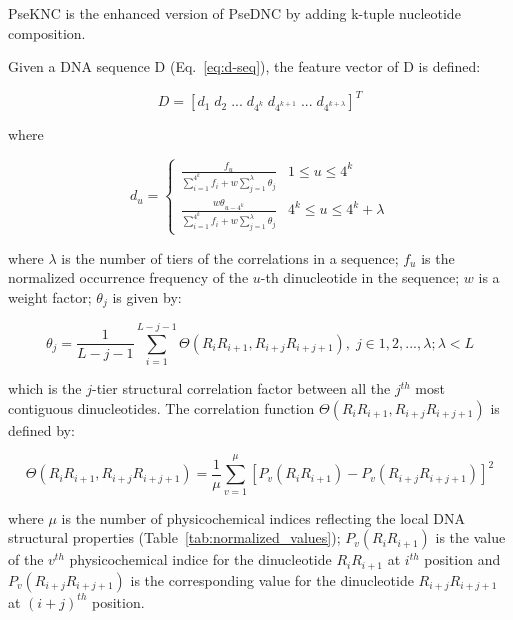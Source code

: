 
\gls{PseKNC} is the enhanced version of \gls{PseDNC} by adding k-tuple nucleotide composition.

Given a \gls{DNA} sequence D (Eq.~\ref{eq:d-seq}), the feature vector of D is defined:

\begin{equation}\label{eq:PseKNC-feature-vector}
    D = [d_{1}\;d_{2}\;...\;d_{4^{k}}\;d_{4^{k+1}}\;...\;d_{4^{k+ \lambda}}]^{T}
\end{equation}

\noindent where

\begin{equation}\label{eq:PseKNC-du}
    d_{u} = 
    \begin{cases}
        \frac{f_{u}}{\sum_{i=1}^{4^{k}} f_{i} + w\sum_{j=1}^{\lambda}\theta_{j}} & 1 \le u \le 4^{k}
    \\
        \frac{w\theta_{u-4^{k}}}{\sum_{i=1}^{4^{k}} f_{i} + w\sum_{j=1}^{\lambda}\theta_{j}} & 4^{k} \le u \le 4^{k} + \lambda
    
    \end{cases}
\end{equation}

\noindent where $\lambda$ is the number of tiers of the correlations in a sequence; $f_{u}$ is the normalized occurrence frequency of the $u$-th dinucleotide in the sequence; $w$ is a weight factor; $\theta_{j}$ is given by:

\begin{equation}\label{eq:PseKNC-thetas}
\theta_{j} = \frac{1}{L-j-1} \sum_{i=1}^{L-j-1}\Theta(R_{i}R_{i+1}, R_{i+j}R_{i+j+1}), \;j\in{1,2,...,\lambda;\lambda < L}
\end{equation}

\noindent which is the $j$-tier structural correlation factor between all the $j^{th}$ most
contiguous dinucleotides. The correlation function $\Theta(R_{i}R_{i+1}, R_{i+j}R_{i+j+1})$ is defined by:

\begin{equation}\label{eq:PseKNC-correlation}
    \Theta(R_{i}R_{i+1}, R_{i+j}R_{i+j+1}) = \frac{1}{\mu}\sum_{v=1}^{\mu}[P_{v} (R_{i}R_{i+1}) - P_{v}(R_{i+j}R_{i+j+1})]^{2}
\end{equation}

\noindent where $\mu$ is the number of physicochemical indices reflecting the local \gls{DNA} structural properties (Table~\ref{tab:normalized_values}); $P_{v} (R_{i}R_{i+1})$ is the value of the $v^{th}$ physicochemical indice for the dinucleotide $R_{i}R_{i+1}$ at $i^{th}$ position and $P_{v} (R_{i+j}R_{i+j+1})$ is the corresponding value for the dinucleotide $R_{i+j}R_{i+j+1}$ at $(i+j)^{th}$ position.


